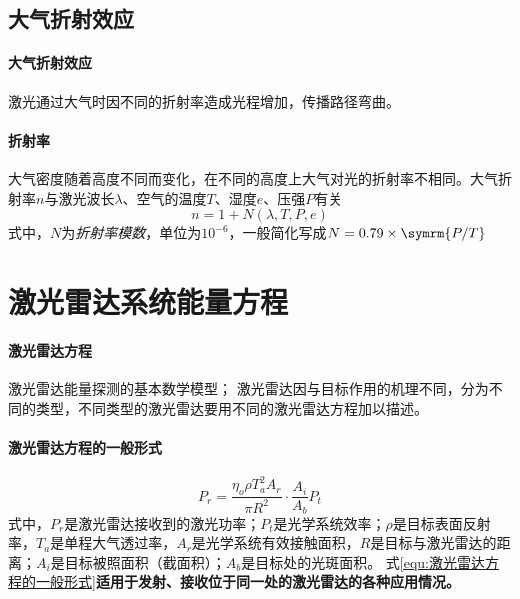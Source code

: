 \subsection{大气折射效应} %

\paragraph{大气折射效应}激光通过大气时因不同的折射率造成光程增加，传播路径弯曲。

\paragraph{折射率}大气密度随着高度不同而变化，在不同的高度上大气对光的折射率不相同。大气折射率$ n $与激光波长$ \lambda $、空气的温度$ T $、湿度$ e $、压强$ P $有关
\begin{equation}
n = 1 + N(\lambda,T,P,e)
\end{equation}
式中，$ N $为\textit{折射率模数}，单位为$ 10^{-6} $，一般简化写成$ N = 0.79 \times \symrm{P/T} $

\section{激光雷达系统能量方程} %

\paragraph{激光雷达方程}激光雷达能量探测的基本数学模型；
激光雷达因与目标作用的机理不同，分为不同的类型，不同类型的激光雷达要用不同的激光雷达方程加以描述。

\paragraph{激光雷达方程的一般形式}
\begin{equation}\label{equ:激光雷达方程的一般形式}
P_r = \dfrac{\eta_o \rho T_a^2 A_r}{\pi R^2} \cdot \dfrac{A_i}{A_b}P_t
\end{equation}
式中，$ P_r $是激光雷达接收到的激光功率；$ P_t $是光学系统效率；$ \rho $是目标表面反射率，$ T_a $是单程大气透过率，$ A_r $是光学系统有效接触面积，$ R $是目标与激光雷达的距离；$ A_i $是目标被照面积（截面积）；$ A_b $是目标处的光斑面积。
式\eqref{equ:激光雷达方程的一般形式}\textbf{适用于发射、接收位于同一处的激光雷达的各种应用情况。}

